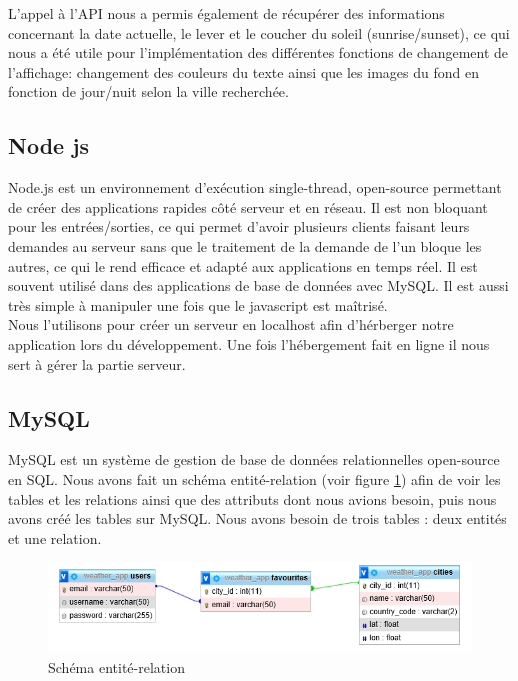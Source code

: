 \documentclass[12pt, french]{article}
\begin{document}
			L’appel à l’API nous a permis également de récupérer des informations concernant la date actuelle, le lever et le coucher du soleil (sunrise/sunset), ce qui nous a été utile pour l’implémentation des différentes fonctions de changement de l’affichage: changement des couleurs du texte ainsi que les images du fond en fonction de jour/nuit selon la ville recherchée.

		\subsection{Node js}
		Node.js \cite{NodeJS} est un environnement d’exécution single-thread, open-source permettant de créer des applications rapides côté serveur et en réseau. Il est non bloquant pour les entrées/sorties, ce qui permet d'avoir plusieurs clients faisant leurs demandes au serveur sans que le traitement de la demande de l'un bloque les autres, ce qui le rend efficace et adapté aux applications en temps réel. Il est souvent utilisé dans des applications de base de données avec MySQL. Il est aussi très simple à manipuler une fois que le javascript est maîtrisé.\\
		Nous l'utilisons pour créer un serveur en localhost afin d'hérberger notre application lors du développement. Une fois l'hébergement fait en ligne il nous sert à gérer la partie serveur.
		
		\subsection{MySQL}
		MySQL \cite{MySQL} est un système de gestion de base de données relationnelles open-source en SQL. Nous avons fait un schéma entité-relation (voir figure \ref{fig:entite_relation}) afin de voir les tables et les relations ainsi que des attributs dont nous avions besoin, puis nous avons créé les tables sur MySQL. Nous avons besoin de trois tables : deux entités et une relation.\newline
		\begin{figure}[htbp]
            \includegraphics{images/schema_entite_relation.PNG}
            \caption{Schéma entité-relation}
            \label{fig:entite_relation}
        \end{figure}\newline~~\\
        
\end{document}

